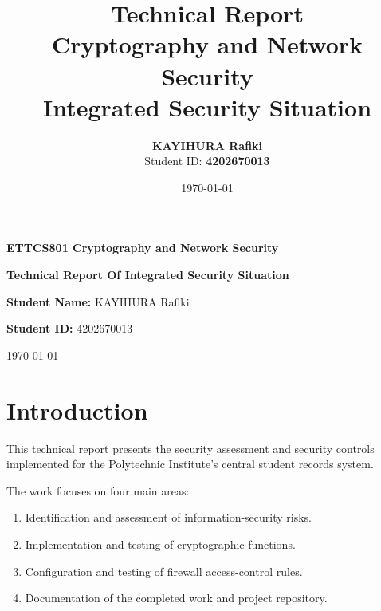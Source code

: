 \documentclass[12pt,a4paper]{article}
\title{
    \textbf{Technical Report}\\[0.3cm]
    \large Cryptography and Network Security\\
    \large Integrated Security Situation
}
\author{
    \textbf{KAYIHURA Rafiki}\\
    Student ID: \textbf{4202670013}
}
\date{\today}
\begin{document}
\begin{titlepage}

\centering

\vspace*{3cm}

{\Large \textbf{ETTCS801 Cryptography and Network Security}\par}

\vspace{1.5cm}

{\Huge \textbf{Technical Report Of Integrated Security Situation}\par}


\vspace{2.5cm}

{\large
\textbf{Student Name:} KAYIHURA Rafiki
\par}

\vspace{0.4cm}

{\large
\textbf{Student ID:} 4202670013
\par}

\vspace{0.4cm}

\vfill

{\large \today\par}

\end{titlepage}


\section{Introduction}

This technical report presents the security assessment and security controls implemented for the Polytechnic Institute's central student records system.

The work focuses on four main areas:

\begin{enumerate}
    \item Identification and assessment of information-security risks.
    \item Implementation and testing of cryptographic functions.
    \item Configuration and testing of firewall access-control rules.
    \item Documentation of the completed work and project repository.
\end{enumerate}
\end{document}
